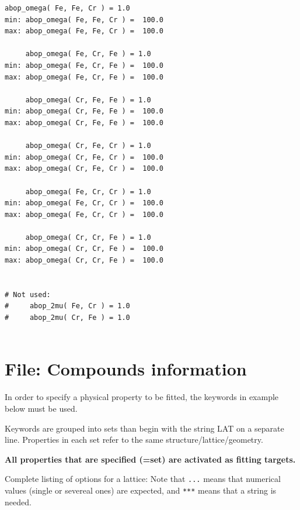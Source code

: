 \documentclass[a4paper,12pt,pdftex,onecolumn]{article}
\begin{document}
\begin{Verbatim}[fontsize=\relsize{-1},frame=single]
     abop_omega( Fe, Fe, Cr ) = 1.0
min: abop_omega( Fe, Fe, Cr ) =  100.0
max: abop_omega( Fe, Fe, Cr ) =  100.0

     abop_omega( Fe, Cr, Fe ) = 1.0
min: abop_omega( Fe, Cr, Fe ) =  100.0
max: abop_omega( Fe, Cr, Fe ) =  100.0

     abop_omega( Cr, Fe, Fe ) = 1.0
min: abop_omega( Cr, Fe, Fe ) =  100.0
max: abop_omega( Cr, Fe, Fe ) =  100.0

     abop_omega( Cr, Fe, Cr ) = 1.0
min: abop_omega( Cr, Fe, Cr ) =  100.0
max: abop_omega( Cr, Fe, Cr ) =  100.0

     abop_omega( Fe, Cr, Cr ) = 1.0
min: abop_omega( Fe, Cr, Cr ) =  100.0
max: abop_omega( Fe, Cr, Cr ) =  100.0

     abop_omega( Cr, Cr, Fe ) = 1.0
min: abop_omega( Cr, Cr, Fe ) =  100.0
max: abop_omega( Cr, Cr, Fe ) =  100.0


# Not used:
#     abop_2mu( Fe, Cr ) = 1.0
#     abop_2mu( Cr, Fe ) = 1.0


\end{Verbatim}








\section{File: Compounds information}

In order to specify a physical property to be fitted,
the keywords in example below must be used.

Keywords are grouped into sets than begin with the string
LAT on a separate line. Properties in each set refer to
the same structure/lattice/geometry.

\textbf{All properties that are specified (=set) are activated as fitting
targets.}


Complete listing of options for a lattice: Note that \verb+...+ means that
numerical values (single or severeal ones) are expected, and \verb+***+ means
that a string is needed.
\end{document}
